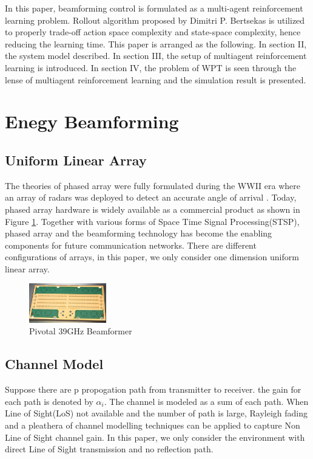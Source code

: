 In this paper, beamforming control is formulated as a multi-agent reinforcement learning problem. Rollout algorithm proposed by Dimitri P. Bertsekas \cite{Bertsekas2019MultiagentRA} is utilized to properly trade-off action space complexity and state-space complexity, hence reducing the learning time. This paper is arranged as the following. In section II, the system model described. In section III, the setup of multiagent reinforcement learning is introduced. In section IV, the problem of WPT is seen through the lense of multiagent reinforcement learning and the simulation result is presented.


\section{Enegy Beamforming}
\subsection{Uniform Linear Array}
The theories of phased array were fully formulated during the WWII era where an array of radars was deployed to detect an accurate angle of arrival \cite{5237174}. Today, phased array hardware is widely available as a commercial product as shown in Figure \ref{fig:pivotal}. Together with various forms of Space Time Signal Processing(STSP), phased array and the beamforming technology has become the enabling components for future communication networks. There are different configurations of arrays, in this paper, we only consider one dimension uniform linear array.

\begin{figure}[H]
\centering
\includegraphics[width=0.3\textwidth]{beamformer.png}
\caption{Pivotal 39GHz Beamformer}
\label{fig:pivotal}
\end{figure}
\subsection{Channel Model}

Suppose there are p propogation path from transmitter to receiver. the gain for each path is denoted by $\alpha_i$. The channel is modeled as a sum of each path. When Line of Sight(LoS) not available and the number of path is large, Rayleigh fading and a pleathera of channel modelling techniques can be applied to capture Non Line of Sight channel gain. In this paper, we only consider the environment with direct Line of Sight transmission and no reflection path.

